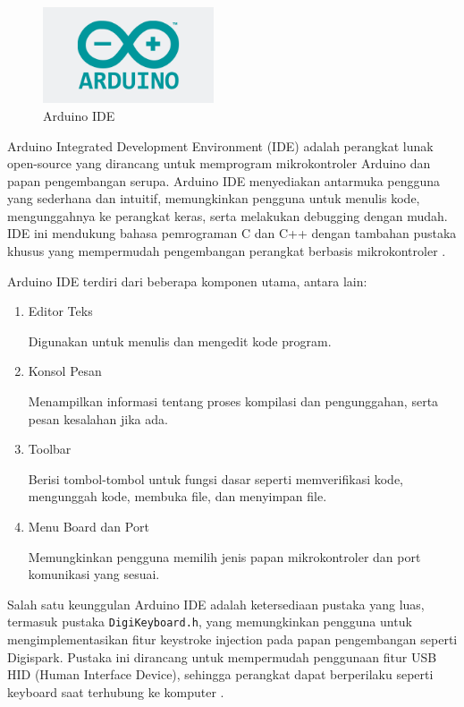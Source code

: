 \begin{figure}
	\centering
	\includegraphics[width=0.45\textwidth]
		{assets/pics/arduinoIDElogo.png}
	\caption{Arduino IDE}
	\label{fig:testGambar}
\end{figure}

Arduino Integrated Development Environment (IDE) adalah perangkat lunak open-source yang dirancang untuk memprogram mikrokontroler Arduino dan papan pengembangan serupa. Arduino IDE menyediakan antarmuka pengguna yang sederhana dan intuitif, memungkinkan pengguna untuk menulis kode, mengunggahnya ke perangkat keras, serta melakukan debugging dengan mudah. IDE ini mendukung bahasa pemrograman C dan C++ dengan tambahan pustaka khusus yang mempermudah pengembangan perangkat berbasis mikrokontroler \citep{arduinoide_docs}.


Arduino IDE terdiri dari beberapa komponen utama, antara lain:
\begin{enumerate}
    \item{Editor Teks}
    
    Digunakan untuk menulis dan mengedit kode program.
    
    \item{Konsol Pesan}
    
    Menampilkan informasi tentang proses kompilasi dan pengunggahan, serta pesan kesalahan jika ada.
    
    \item{Toolbar}
    
    Berisi tombol-tombol untuk fungsi dasar seperti memverifikasi kode, mengunggah kode, membuka file, dan menyimpan file.
    
    \item{Menu Board dan Port}
    
    Memungkinkan pengguna memilih jenis papan mikrokontroler dan port komunikasi yang sesuai.
    
\end{enumerate}


Salah satu keunggulan Arduino IDE adalah ketersediaan pustaka yang luas, termasuk pustaka \texttt{DigiKeyboard.h}, yang memungkinkan pengguna untuk mengimplementasikan fitur keystroke injection pada papan pengembangan seperti Digispark. Pustaka ini dirancang untuk mempermudah penggunaan fitur USB HID (Human Interface Device), sehingga perangkat dapat berperilaku seperti keyboard saat terhubung ke komputer \citep{digikeyboard}.


